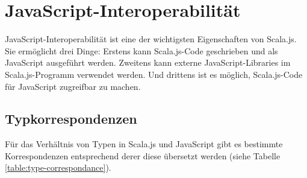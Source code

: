 \documentclass[a4paper, 12pt, hidelinks, listof=totoc, listoftables=totoc, bibliography=totoc]{scrreprt}
\begin{document}
	


\section{JavaScript-Interoperabilität}

JavaScript-Interoperabilität ist eine der wichtigsten Eigenschaften von Scala.js. Sie ermöglicht drei Dinge: Erstens kann Scala.js-Code geschrieben und als JavaScript ausgeführt werden. Zweitens kann externe JavaScript-Libraries im Scala.js-Programm verwendet werden. Und drittens ist es möglich, Scala.js-Code für JavaScript zugreifbar zu machen.

\subsection{Typkorrespondenzen}

Für das Verhältnis von Typen in Scala.js und JavaScript gibt es bestimmte Korrespondenzen entsprechend derer diese übersetzt werden (siehe Tabelle \ref{table:type-correspondance}).

\medskip
\end{document}
